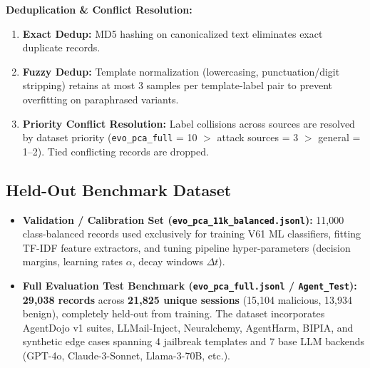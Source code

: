\documentclass[runningheads]{llncs}
\begin{document}
\textbf{Deduplication \& Conflict Resolution:}
\begin{enumerate}
    \item \textbf{Exact Dedup:} MD5 hashing on canonicalized text eliminates exact duplicate records.
    \item \textbf{Fuzzy Dedup:} Template normalization (lowercasing, punctuation/digit stripping) retains at most 3 samples per template-label pair to prevent overfitting on paraphrased variants.
    \item \textbf{Priority Conflict Resolution:} Label collisions across sources are resolved by dataset priority (\texttt{evo\_pca\_full} = 10 $>$ attack sources = 3 $>$ general = 1--2). Tied conflicting records are dropped.
\end{enumerate}

\subsection{Held-Out Benchmark Dataset}
\begin{itemize}
    \item \textbf{Validation / Calibration Set (\texttt{evo\_pca\_11k\_balanced.jsonl}):} 11,000 class-balanced records used exclusively for training V61 ML classifiers, fitting TF-IDF feature extractors, and tuning pipeline hyper-parameters (decision margins, learning rates $\alpha$, decay windows $\Delta t$).
    \item \textbf{Full Evaluation Test Benchmark (\texttt{evo\_pca\_full.jsonl} / \texttt{Agent\_Test}):} \textbf{29,038 records} across \textbf{21,825 unique sessions} (15,104 malicious, 13,934 benign), completely held-out from training. The dataset incorporates AgentDojo v1 suites, LLMail-Inject, Neuralchemy, AgentHarm, BIPIA, and synthetic edge cases spanning 4 jailbreak templates and 7 base LLM backends (GPT-4o, Claude-3-Sonnet, Llama-3-70B, etc.).
\end{itemize}
\end{document}
